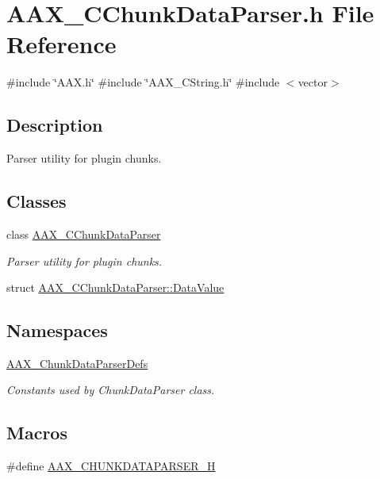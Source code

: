 \hypertarget{a00416}{}\section{A\+A\+X\+\_\+\+C\+Chunk\+Data\+Parser.\+h File Reference}
\label{a00416}
{\ttfamily \#include \char`\"{}A\+A\+X.\+h\char`\"{}}\newline
{\ttfamily \#include \char`\"{}A\+A\+X\+\_\+\+C\+String.\+h\char`\"{}}\newline
{\ttfamily \#include $<$vector$>$}\newline


\subsection{Description}
Parser utility for plugin chunks. 

\subsection*{Classes}
\begin{DoxyCompactItemize}
\item 
class \mbox{\hyperlink{a01461}{A\+A\+X\+\_\+\+C\+Chunk\+Data\+Parser}}
\begin{DoxyCompactList}\small\item\em Parser utility for plugin chunks. \end{DoxyCompactList}\item 
struct \mbox{\hyperlink{a01465}{A\+A\+X\+\_\+\+C\+Chunk\+Data\+Parser\+::\+Data\+Value}}
\end{DoxyCompactItemize}
\subsection*{Namespaces}
\begin{DoxyCompactItemize}
\item 
 \mbox{\hyperlink{a00851}{A\+A\+X\+\_\+\+Chunk\+Data\+Parser\+Defs}}
\begin{DoxyCompactList}\small\item\em Constants used by Chunk\+Data\+Parser class. \end{DoxyCompactList}\end{DoxyCompactItemize}
\subsection*{Macros}
\begin{DoxyCompactItemize}
\item 
\#define \mbox{\hyperlink{a00416_af6b3d6065173ac55090ce0dec7b2b31a}{A\+A\+X\+\_\+\+C\+H\+U\+N\+K\+D\+A\+T\+A\+P\+A\+R\+S\+E\+R\+\_\+H}}
\end{DoxyCompactItemize}
